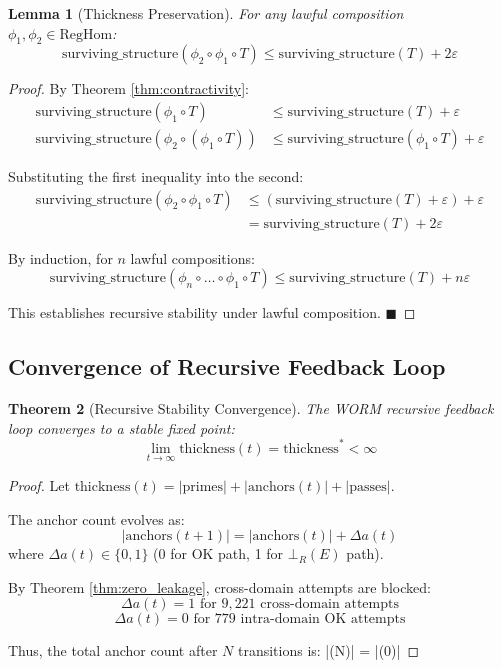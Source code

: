 \documentclass[11pt,a4paper]{article}
\newtheorem{theorem}{Theorem}[section]
\newtheorem{lemma}[theorem]{Lemma}
\begin{document}
\begin{lemma}[Thickness Preservation]\label{lemma:thickness_preservation}
For any lawful composition $\phi_1, \phi_2 \in \text{RegHom}$:
$$\text{surviving\_structure}(\phi_2 \circ \phi_1 \circ T) \leq \text{surviving\_structure}(T) + 2\varepsilon$$
\end{lemma}

\begin{proof}
By Theorem \ref{thm:contractivity}:
\begin{align}
\text{surviving\_structure}(\phi_1 \circ T) &\leq \text{surviving\_structure}(T) + \varepsilon \\
\text{surviving\_structure}(\phi_2 \circ (\phi_1 \circ T)) &\leq \text{surviving\_structure}(\phi_1 \circ T) + \varepsilon
\end{align}

Substituting the first inequality into the second:
\begin{align}
\text{surviving\_structure}(\phi_2 \circ \phi_1 \circ T) &\leq (\text{surviving\_structure}(T) + \varepsilon) + \varepsilon \\
&= \text{surviving\_structure}(T) + 2\varepsilon
\end{align}

By induction, for $n$ lawful compositions:
$$\text{surviving\_structure}(\phi_n \circ \dots \circ \phi_1 \circ T) \leq \text{surviving\_structure}(T) + n\varepsilon$$

This establishes recursive stability under lawful composition. \hfill $\blacksquare$
\end{proof}

\subsection{Convergence of Recursive Feedback Loop}

\begin{theorem}[Recursive Stability Convergence]\label{thm:recursive_convergence}
The WORM recursive feedback loop converges to a stable fixed point:
$$\lim_{t \to \infty} \text{thickness}(t) = \text{thickness}^* < \infty$$
\end{theorem}

\begin{proof}
Let $\text{thickness}(t) = |\text{primes}| + |\text{anchors}(t)| + |\text{passes}|$.

The anchor count evolves as:
$$|\text{anchors}(t+1)| = |\text{anchors}(t)| + \Delta a(t)$$
where $\Delta a(t) \in \{0, 1\}$ (0 for OK path, 1 for $\bot_R(E)$ path).

By Theorem \ref{thm:zero_leakage}, cross-domain attempts are blocked:
$$\Delta a(t) = 1 \text{ for } 9,221 \text{ cross-domain attempts}$$
$$\Delta a(t) = 0 \text{ for } 779 \text{ intra-domain OK attempts}$$

Thus, the total anchor count after $N$ transitions is:
$$|(N)| = |(0)| 
\end{proof}

\nocite{*}
  

\end{document}
